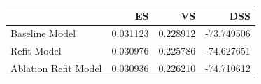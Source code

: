 \begin{tabular}{lrrr}
\toprule
 & ES & VS & DSS \\
\midrule
Baseline Model & 0.031123 & 0.228912 & -73.749506 \\
Refit Model & 0.030976 & 0.225786 & -74.627651 \\
Ablation Refit Model & 0.030936 & 0.226210 & -74.710612 \\
\bottomrule
\end{tabular}
